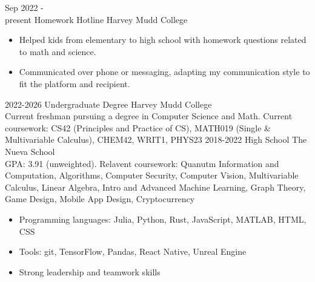 \documentclass[9pt]{developercv} %
\begin{document}
\begin{entrylist}
	\entry 
		{Sep 2022 -\\present} 
		{Homework Hotline}
		{Harvey Mudd College}
		{\begin{itemize}[noitemsep, topsep=1pt]
			\item Helped kids from elementary to high school with homework questions related to math and science.
			\item Communicated over phone or messaging, adapting my communication style to fit the platform and recipient.
		\end{itemize}}
\end{entrylist}



\begin{entrylist}
	\entry
		{2022-2026}
		{Undergraduate Degree}
		{Harvey Mudd College}
		{\\Current freshman pursuing a degree in Computer Science and Math. Current coursework: CS42 (Principles and Practice of CS), MATH019 (Single \& Multivariable Calculus), CHEM42, WRIT1, PHYS23}
	\entry
		{2018-2022}
		{High School}
		{The Nueva School}
		{\\GPA: 3.91 (unweighted). Relavent coursework: Quanutm Information and Computation, Algorithms, Computer Security, Computer Vision, Multivariable Calculus, Linear Algebra, Intro and Advanced Machine Learning, Graph Theory, Game Design, Mobile App Design, Cryptocurrency}
\end{entrylist}



\begin{itemize}[noitemsep, topsep=0pt]
	\item Programming languages: Julia, Python, Rust, JavaScript, MATLAB, HTML, CSS
	\item Tools: git, TensorFlow, Pandas, React Native, Unreal Engine 
	\item Strong leadership and teamwork skills
\end{itemize}
\end{document}
